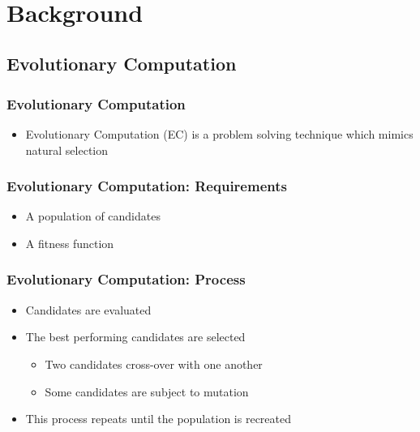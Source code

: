 \documentclass{beamer}
\begin{document}
\begin{frame}
\begin{columns}
\begin{column}{0.4\textwidth}
       \\
  \end{column}
  \end{columns}
\end{frame}


\section{Background}

\subsection{Evolutionary Computation}
\begin{frame}
  \frametitle{Evolutionary Computation}
 \begin{itemize}
  \item Evolutionary Computation (EC) is a problem solving technique which mimics natural selection
 
   \end{itemize}
\end{frame}
	
\begin{frame}
\frametitle{Evolutionary Computation: Requirements}
\begin{itemize}
  \item A population of candidates
  \item A fitness function
\end{itemize}
\end{frame}

\begin{frame}
\frametitle{Evolutionary Computation: Process}
 \begin{itemize}
  \item Candidates are evaluated
  \item The best performing candidates are selected
 \begin{itemize}
  \item Two candidates cross-over with one another
    \item Some candidates are subject to mutation
\end{itemize}
  \item This process repeats until the population is recreated
\end{itemize}
\end{frame}
\end{document}
